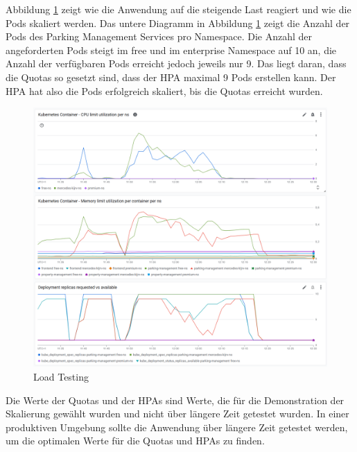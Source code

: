 Abbildung \ref{fig:load-testing} zeigt wie die Anwendung auf die steigende Last reagiert und wie die Pods skaliert werden.
Das untere Diagramm in Abbildung \ref{fig:load-testing} zeigt die Anzahl der Pods des Parking Management Services pro Namespace.
Die Anzahl der angeforderten Pods steigt im free und im enterprise Namespace auf 10 an, die Anzahl der verfügbaren 
Pods erreicht jedoch jeweils nur 9. Das liegt daran, dass die Quotas so gesetzt sind, dass der HPA maximal 9 Pods 
erstellen kann. Der HPA hat also die Pods erfolgreich skaliert, bis die Quotas erreicht wurden.

\begin{figure}[H]
  \centering
  \includegraphics[width=\textwidth]{resources/LoadTest.png}
  \caption{Load Testing}
  \label{fig:load-testing}
\end{figure}

Die Werte der Quotas und der HPAs sind Werte, die für die Demonstration der Skalierung gewählt wurden und nicht über längere Zeit getestet wurden.
In einer produktiven Umgebung sollte die Anwendung über längere Zeit getestet werden, um die optimalen Werte für die Quotas und HPAs zu finden. 